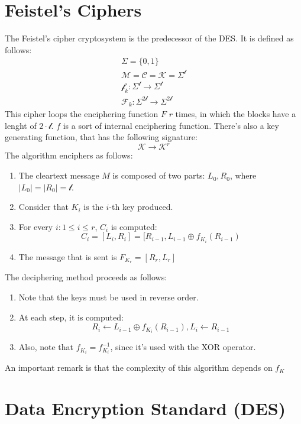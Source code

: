 \section{Feistel's Ciphers}
The Feistel's cipher cryptosystem is the predecessor of the DES. It is defined as follows:
\begin{align*}
    \Sigma = \{0,1\} \\
    \mathcal{M} = \mathcal{C} = \mathcal{K} = \Sigma^{\mathcal{l}}\\
    \mathcal{f}_{k}: \Sigma^{\mathcal{l}} \rightarrow \Sigma^{\mathcal{l}}\\
    \mathcal{F}_{k}: \Sigma^{2\mathcal{l}} \rightarrow \Sigma^{2\mathcal{l}}
\end{align*}
This cipher loops the enciphering function $F$ $r$ times, in which the blocks have a lenght of $2 \cdot \mathcal{l}$. $f$ is a sort of internal enciphering function. \newline
There's also a key generating function, that has the following signature:
\[\mathcal{K} \rightarrow \mathcal{K}^{r}\]
The algorithm enciphers as follows:
\begin{enumerate}
    \item The cleartext message $M$ is composed of two parts: $L_{0}, R_{0}$, where $|L_{0}| = |R_{0}| = \mathcal{l}$.
    \item Consider that $K_{i}$ is the $i$-th key produced.
    \item For every $i: 1 \leq i \leq r$, $C_{i}$ is computed:
    \[C_{i} = [L_{i}, R_{i}] = [R_{i-1}, L_{i-1} \oplus f_{K_{i}}(R_{i-1})\]
    \item The message that is sent is $F_{K_{r}} = [R_{r}, L_{r}]$
\end{enumerate}
The deciphering method proceeds as follows:
\begin{enumerate}
    \item Note that the keys must be used in reverse order.
    \item At each step, it is computed:
    \[R_{i} \gets L_{i-1} \oplus f_{K_{i}}(R_{i-1}), L_{i} \gets R_{i-1}\]
    \item Also, note that $f_{K_{i}} = f^{-1}_{K_{i}}$, since it's used with the XOR operator.
\end{enumerate}
An important remark is that the complexity of this algorithm depends on $f_{K}$

\section{Data Encryption Standard (DES)}
